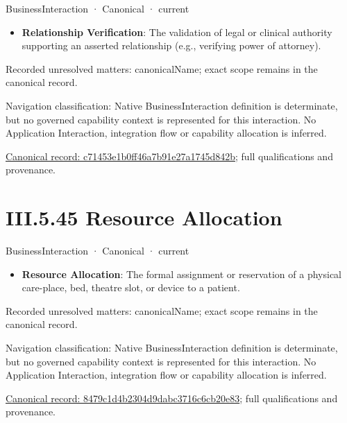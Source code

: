 \label{element:c71453e1b0ff46a7b91e27a1745d842b}
{\small BusinessInteraction · Canonical · current}\par

\begin{itemize}


\item \textbf{Relationship Verification}: The validation of legal or clinical authority supporting an asserted relationship (e.g., verifying power of attorney).

\end{itemize}

{\small Recorded unresolved matters: canonicalName; exact scope remains in the canonical record.}\par
{\small Navigation classification: Native BusinessInteraction definition is determinate, but no governed capability context is represented for this interaction. No Application Interaction, integration flow or capability allocation is inferred.}\par
{\footnotesize \href{../../../../../../../continuum/business/business-interaction/c71453e1b0ff46a7b91e27a1745d842b.md}{Canonical record: c71453e1b0ff46a7b91e27a1745d842b}; full qualifications and provenance.}\par
\section*{III.5.45 Resource Allocation}
\label{navigation:III.5.45}

\label{element:8479c1d4b2304d9dabc3716c6cb20e83}
{\small BusinessInteraction · Canonical · current}\par

\begin{itemize}


\item \textbf{Resource Allocation}: The formal assignment or reservation of a physical care-place, bed, theatre slot, or device to a patient.

\end{itemize}

{\small Recorded unresolved matters: canonicalName; exact scope remains in the canonical record.}\par
{\small Navigation classification: Native BusinessInteraction definition is determinate, but no governed capability context is represented for this interaction. No Application Interaction, integration flow or capability allocation is inferred.}\par
{\footnotesize \href{../../../../../../../continuum/business/business-interaction/8479c1d4b2304d9dabc3716c6cb20e83.md}{Canonical record: 8479c1d4b2304d9dabc3716c6cb20e83}; full qualifications and provenance.}\par
